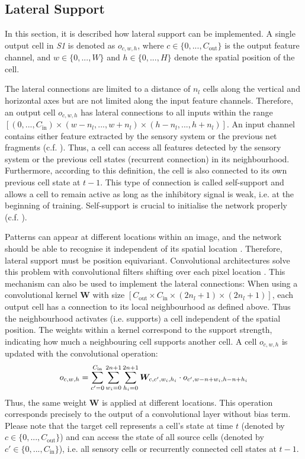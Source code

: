 \subsection{Lateral Support}
In this section, it is described how lateral support can be implemented.
A single output cell in \emph{S1} is denoted as $o_{c,w,h}$, where $c \in \{0, ..., C_{\text{out}}\}$ is the output feature channel, and $w \in \{0, ..., W\}$ and $h \in \{0, ..., H\}$ denote the spatial position of the cell.

The lateral connections are limited to a distance of $n_{l}$ cells along the vertical and horizontal axes but are not limited along the input feature channels.
Therefore, an output cell $o_{c,w,h}$ has lateral connections to all inputs within the range $\left[(0, ..., C_{\text{in}}) \times (w - n_l, ..., w+n_l) \times (h - n_l, ..., h+n_l)\right]$.
An input channel contains either feature extracted by the sensory system or the previous net fragments (c.f. ). Thus, a cell can access all features detected by the sensory system or the previous cell states (recurrent connection) in its neighbourhood.
Furthermore, according to this definition, the cell is also connected to its own previous cell state at $t-1$.
This type of connection is called self-support and allows a cell to remain active as long as the inhibitory signal is weak, i.e. at the beginning of training.
Self-support is crucial to initialise the network properly (c.f. ).

Patterns can appear at different locations within an image, and the network should be able to recognise it independent of its spatial location . 
Therefore, lateral support must be position equivariant.
Convolutional architectures solve this problem with convolutional filters shifting over each pixel location . This mechanism can also be used to implement the lateral connections: When using a convolutional kernel $\boldsymbol{W}$ with size $\left[C_{\text{out}} \times C_{\text{in}} \times (2n_l+1) \times (2n_l+1) \right]$, each output cell has a connection to its local neighbourhood as defined above.
Thus the neighbourhood activates (i.e. supports) a cell independent of the spatial position.
The weights within a kernel correspond to the support strength, indicating how much a neighbouring cell supports another cell. A cell $o_{c,w,h}$ is updated with the convolutional operation: 
%
\begin{align}\eqlbl{convlat_1}
	o_{c,w,h} = \sum_{c'=0}^{C_{\text{in}}} \sum_{w_i=0}^{2n+1} \sum_{h_i=0}^{2n+1} \boldsymbol{W}_{c, c',w_i,h_i} \cdot o_{c',w-n+w_i,h-n+h_i}
\end{align}
%
Thus, the same weight $\boldsymbol{W}$ is applied at different locations.
This operation corresponds precisely to the output of a convolutional layer without bias term.
Please note that the target cell represents a cell's state at time $t$ (denoted by $c \in \{0, ..., C_{\text{out}}\}$) and can access the state of all source cells (denoted by $c' \in \{0, ..., C_{\text{in}}\}$), i.e. all sensory cells or recurrently connected cell states at $t-1$.

